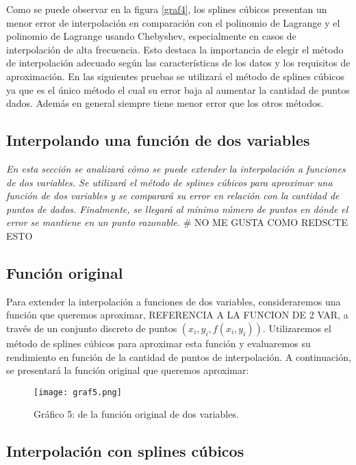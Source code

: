 \documentclass[12pt,a4]{article} %
\begin{document}
\begin{multicols}{2}
Como se puede observar en la figura \ref{graf4}, los splines cúbicos presentan un menor error de interpolación en comparación con el polinomio de Lagrange y el polinomio de Lagrange usando Chebyshev, especialmente en casos de interpolación de alta frecuencia. Esto destaca la importancia de elegir el método de interpolación adecuado según las características de los datos y los requisitos de aproximación. En las siguientes pruebas se utilizará el método de splines cúbicos ya que es el único método el cual su error baja al aumentar la cantidad de puntos dados. Además en general siempre tiene menor error que los otros métodos.

\subsection{Interpolando una función de dos variables}

\textit{En esta sección se analizará cómo se puede extender la interpolación a funciones de dos variables. Se utilizará el método de splines cúbicos para aproximar una función de dos variables y se comparará su error en relación con la cantidad de puntos de dados. Finalmente, se llegará al mínimo número de puntos en dónde el error se mantiene en un punto razonable.} # NO ME GUSTA COMO REDSCTE ESTO

\subsection{Función original}

Para extender la interpolación a funciones de dos variables, consideraremos una función que queremos aproximar, REFERENCIA A LA FUNCION DE 2 VAR, a través de un conjunto discreto de puntos $(x_i, y_i, f(x_i, y_i))$. Utilizaremos el método de splines cúbicos para aproximar esta función y evaluaremos su rendimiento en función de la cantidad de puntos de interpolación. A continuación, se presentará la función original que queremos aproximar:

\begin{figure}[H] 
    \centering
    \texttt{[image: graf5.png]}
    \caption{Gráfico 5: de la función original de dos variables.}
    \label{graf5}
\end{figure}

\subsection{Interpolación con splines cúbicos}


\end{multicols}
\end{document}
